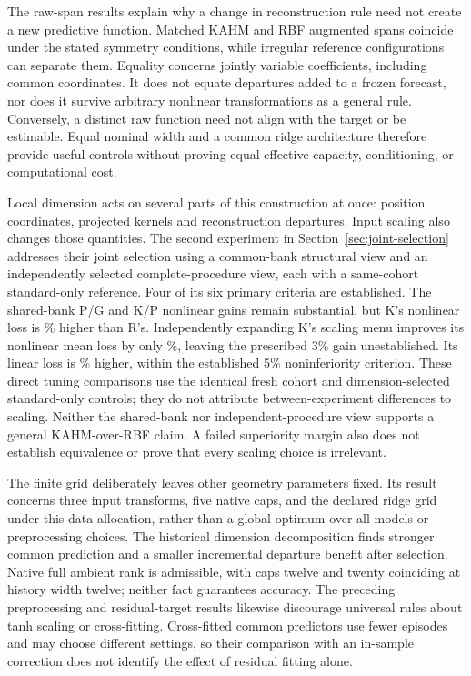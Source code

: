 The raw-span results explain why a change in reconstruction rule need
not create a new predictive function. Matched KAHM and RBF augmented
spans coincide under the stated symmetry conditions, while irregular
reference configurations can separate them. Equality concerns
jointly variable coefficients, including common coordinates.
It does not equate departures added to a frozen forecast, nor does
it survive arbitrary nonlinear transformations as a general rule.
Conversely, a distinct raw function need not align with the target
or be estimable. Equal nominal width and a common ridge architecture
therefore provide useful controls without proving equal effective
capacity, conditioning, or computational cost.

Local dimension acts on several parts of this construction at once:
position coordinates, projected kernels and reconstruction departures.
Input scaling also changes those quantities. The second experiment in
Section~\ref{sec:joint-selection} addresses their joint selection
using a common-bank structural view and an independently selected
complete-procedure view, each with a same-cohort standard-only
reference. Four of its six primary criteria are established.
The shared-bank P/G and K/P nonlinear gains remain substantial,
but K's nonlinear loss is \JSRelativeLossChangeKR\% higher than
R's. Independently expanding K's scaling menu improves its
nonlinear mean loss by only \JSGainJointKNonlinear\%, leaving
the prescribed 3\% gain unestablished. Its linear loss is
\JSRelativeLossChangeJointKLinear\% higher, within the established
5\% noninferiority criterion. These direct tuning comparisons use
the identical fresh cohort and dimension-selected standard-only
controls; they do not attribute between-experiment differences to
scaling. Neither the shared-bank nor independent-procedure view
supports a general KAHM-over-RBF claim. A failed superiority margin
also does not establish equivalence or prove that every scaling
choice is irrelevant.

The finite grid deliberately leaves other geometry parameters fixed.
Its result concerns three input transforms, five native caps, and
the declared ridge grid under this data allocation, rather than a
global optimum over all models or preprocessing choices.
The historical dimension decomposition finds stronger common prediction
and a smaller incremental departure benefit after selection.
Native full ambient rank is admissible, with caps twelve and twenty
coinciding at history width twelve; neither fact guarantees accuracy.
The preceding preprocessing and residual-target results likewise
discourage universal rules about tanh scaling or cross-fitting.
Cross-fitted common predictors use fewer episodes and may choose
different settings, so their comparison with an in-sample correction
does not identify the effect of residual fitting alone.

